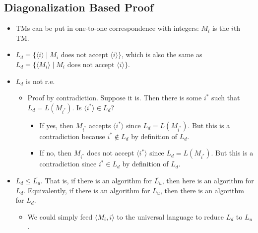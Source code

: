 \subsection{Diagonalization Based Proof}
\begin{itemize}
    \item TMs can be put in one-to-one correspondence with integers: $M_i$ is the $i$th TM.
    \item $L_d = \{ \langle i \rangle \mid \text{$M_i$ does not accept $\langle i \rangle$} \}$, which is also the same as $L_d = \{ \langle M_i \rangle \mid \text{$M_i$ does not accept $\langle i \rangle$} \}$.
    \item $L_d$ is not r.e.
    \begin{itemize}
        \item Proof by contradiction. Suppose it is. Then there is some $i^\ast$ such that $L_d = L(M_{i^\ast})$. Is $\langle i^\ast \rangle \in L_d$?
        \begin{itemize}
            \item If yes, then $M_{i^\ast}$ accepts $\langle i^\ast \rangle$ since $L_d = L(M_{i^\ast})$. But this is a contradiction because $i^\ast \notin L_d$ by definition of $L_d$.
            \item If no, then $M_{i^\ast}$ does not accept $\langle i^\ast \rangle$ since $L_d = L(M_{i^\ast})$. But this is a contradiction since $i^\ast \in L_d$ by definition of $L_d$.
        \end{itemize}
    \end{itemize}
    \item $L_d \leq \overline{L_u}$. That is, if there is an algorithm for $\overline{L_u}$, then here is an algorithm for $L_d$. Equivalently, if there is an algorithm for $L_u$, then there is an algorithm for $L_d$.
    \begin{itemize}
        \item We could simply feed $\langle M_i, i \rangle$ to the universal language to reduce $L_d$ to $L_u$.
    \end{itemize}
\end{itemize}
